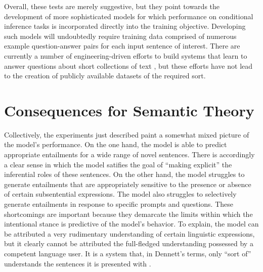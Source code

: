Overall, these tests are merely suggestive, but they point towards the development of more sophisticated models for which performance on conditional inference tasks is incorporated directly into the training objective. Developing such models will undoubtedly require training data comprised of numerous example question-answer pairs for each input sentence of interest. There are currently a number of engineering-driven efforts to build systems that learn to answer questions about short collections of text \citep[e.g.,][]{Weston:2015,Weston:2016,Sukhbataar:2015}, but these efforts have not lead to the creation of publicly available datasets of the required sort.

\section{Consequences for Semantic Theory}\label{sec:consequences}

Collectively, the experiments just described paint a somewhat mixed picture of the model's performance. On the one hand, the model is able to predict appropriate entailments for a wide range of novel sentences. There is accordingly a clear sense in which the model satifies the goal of ``making explicit'' the inferential roles of these sentences. On the other hand, the model struggles to generate entailments that are appropriately sensitive to the presence or absence of certain subsentential expressions. The model also struggles to selectively generate entailments in response to specific prompts and questions. These shortcomings are important because they demarcate the limits within which the intentional stance is predictive of the model's behavior. To explain, the model can be attributed a very rudimentary understanding of certain linguistic expressions, but it clearly cannot be attributed the full-fledged understanding possessed by a competent language user. It is a system that, in Dennett's terms, only ``sort of'' understands the sentences it is presented with \citep[qtd. in][]{Rothman:2017}.

